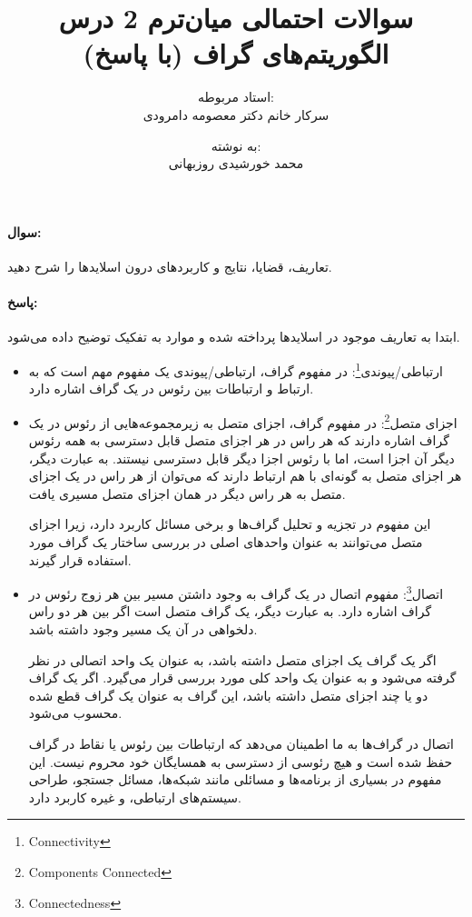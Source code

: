 \documentclass[a4paper,10pt]{article}
\title{سوالات احتمالی میان‌ترم 2 درس الگوریتم‌های گراف (با پاسخ)}
\author{استاد مربوطه:\\سرکار خانم دکتر معصومه دامرودی \and به نوشته:\\محمد خورشیدی روزبهانی}
\date{}
\begin{document}
    \maketitle

    \paragraph{سوال:} تعاریف، قضایا، نتایج و کاربردهای درون اسلایدها را شرح دهید.

    \paragraph{پاسخ:} اﺑﺘﺪا ﺑﻪ ﺗﻌﺎرﯾﻒ ﻣﻮﺟﻮد در اﺳﻼﯾﺪﻫﺎ پرداخته ﺷﺪه و ﻣﻮارد ﺑﻪ تفکیک ﺗﻮﺿﯿﺢ داده میﺷﻮد.

    \begin{itemize}
        
        \item ارتباطی/پیوندی\footnote{\hspace{2pt}Connectivity}: در مفهوم گراف، ارتباطی/پیوندی یک مفهوم مهم است که به ارتباط و ارتباطات بین رئوس در یک گراف اشاره دارد.

        \item اجزای متصل\footnote{\hspace{2pt}Components Connected}: در مفهوم گراف، اجزای متصل به زیرمجموعه‌هایی از رئوس در یک گراف اشاره دارند که هر راس در هر اجزای متصل قابل دسترسی به همه‌ رئوس دیگر آن اجزا است، اما با رئوس اجزا دیگر قابل دسترسی نیستند. به عبارت دیگر، هر اجزای متصل به گونه‌ای با هم ارتباط دارند که می‌توان از هر راس در یک اجزای متصل به هر راس دیگر در همان اجزای متصل مسیری یافت.
        
        این مفهوم در تجزیه و تحلیل گراف‌ها و برخی مسائل کاربرد دارد، زیرا اجزای متصل می‌توانند به عنوان واحدهای اصلی در بررسی ساختار یک گراف مورد استفاده قرار گیرند.
        
        \item اتصال\footnote{\hspace{2pt}Connectedness}: مفهوم اتصال در یک گراف به وجود داشتن مسیر بین هر زوج رئوس در گراف اشاره دارد. به عبارت دیگر، یک گراف متصل است اگر بین هر دو راس دلخواهی در آن یک مسیر وجود داشته باشد.

        اگر یک گراف یک اجزای متصل داشته باشد، به عنوان یک واحد اتصالی در نظر گرفته می‌شود و به عنوان یک واحد کلی مورد بررسی قرار می‌گیرد. اگر یک گراف دو یا چند اجزای متصل داشته باشد، این گراف به عنوان یک گراف قطع شده محسوب می‌شود.

        اتصال در گراف‌ها به ما اطمینان می‌دهد که ارتباطات بین رئوس یا نقاط در گراف حفظ شده است و هیچ رئوسی از دسترسی به همسایگان خود محروم نیست. این مفهوم در بسیاری از برنامه‌ها و مسائلی مانند شبکه‌ها، مسائل جستجو، طراحی سیستم‌های ارتباطی، و غیره کاربرد دارد.


\end{itemize}
\end{document}
